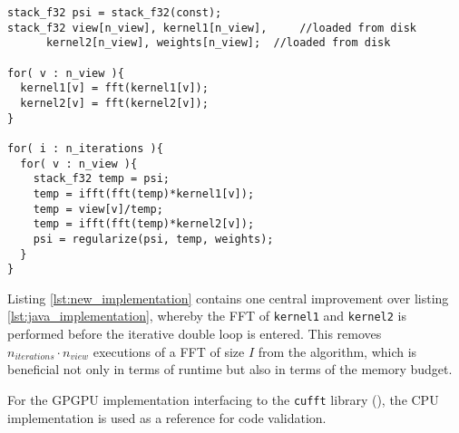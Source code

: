 \begin{lstlisting}[caption={Optimized CPU Implementation of Multi-View Deconvolution. All FFT are explicitely stated \texttt{fft} as well as the corresponding normalized inverse operations \texttt{ifft}. },label={lst:new_implementation}]
stack_f32 psi = stack_f32(const);
stack_f32 view[n_view], kernel1[n_view],     //loaded from disk
	  kernel2[n_view], weights[n_view];  //loaded from disk

for( v : n_view ){
  kernel1[v] = fft(kernel1[v]);
  kernel2[v] = fft(kernel2[v]);
}

for( i : n_iterations ){
  for( v : n_view ){
    stack_f32 temp = psi;
    temp = ifft(fft(temp)*kernel1[v]);
    temp = view[v]/temp;
    temp = ifft(fft(temp)*kernel2[v]);
    psi = regularize(psi, temp, weights);
  }
}
\end{lstlisting}

Listing \ref{lst:new_implementation} contains one central improvement over listing \ref{lst:java_implementation}, whereby the FFT of \texttt{kernel1} and \texttt{kernel2} is performed before the iterative double loop is entered. This removes $n_{iterations}\cdot n_{view}$ executions of a FFT of size $I$ from the algorithm, which is beneficial not only in terms of runtime but also in terms of the memory budget.

For the GPGPU implementation interfacing to the \texttt{cufft} library (\cite{cufft}), the CPU implementation is used as a reference for code validation.
